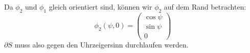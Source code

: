 \documentclass{mywork}
\begin{document}
\begin{aufgabe}
\begin{enumerate}[a)]
				\newpage

				Da $\phi_2$ und $\phi_1$ gleich orientiert sind, können wir $\phi_2$ auf dem Rand betrachten:
				\[
					\phi_2(\psi, 0) = \begin{pmatrix}
						\cos \psi \\
						\sin \psi \\
						0
					\end{pmatrix}
				\]
				$\partial S$ muss also gegen den Uhrzeigersinn durchlaufen werden.

		\end{enumerate}
	\end{aufgabe}
\end{document}
